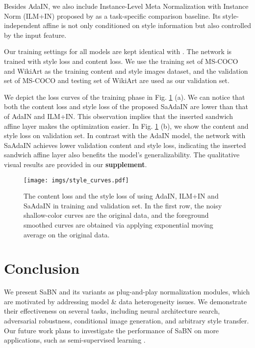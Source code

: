 \documentclass{article}
\begin{document}
Besides AdaIN, we also include Instance-Level Meta Normalization with Instance Norm  (ILM+IN) proposed by \cite{jia2019instance} as a task-specific comparison baseline. Its style-independent affine is not only conditioned on style information but also controlled by the input feature. 

Our training settings for all models are kept identical with \citep{huang2017arbitrary}.  The network is trained with style loss and content loss. We use the training set of MS-COCO \cite{lin2014microsoft} and WikiArt \cite{wikiart} as the training content and style images dataset, and the validation set of MS-COCO and testing set of WikiArt are used as our validation set.

We depict the loss curves of the training phase in Fig. \ref{fig:style_curve} (a). We can notice that both the content loss and style loss of the proposed SaAdaIN are lower than that of AdaIN and ILM+IN. This observation implies that the inserted sandwich affine layer makes the optimization easier. In Fig. \ref{fig:style_curve} (b), we show the content and style loss on validation set. In contrast with the AdaIN model, the network with SaAdaIN achieves lower validation content and style loss, indicating the inserted sandwich affine layer also benefits the model's generalizability. The qualitative visual results are provided in our \textbf{supplement}.
\begin{figure}[t!]
\begin{center}
\texttt{[image: imgs/style\_curves.pdf]}
\end{center}
   \caption{The content loss and the style loss of using AdaIN, ILM+IN and SaAdaIN in training and validation set. In the first row, the noisy shallow-color curves are the original data, and the foreground smoothed curves are obtained via applying exponential moving average on the original data.}
\label{fig:style_curve}
\end{figure}  \section{Conclusion}
 \vspace{-5pt}
We present SaBN and its variants as plug-and-play normalization modules, which are motivated by addressing model \& data heterogeneity issues. We demonstrate their effectiveness on several tasks, including neural architecture search, adversarial robustness, conditional image generation, and arbitrary style transfer. Our future work plans to investigate the performance of SaBN on more applications, such as semi-supervised learning \citep{zajkac2019split}. 
\nocite{langley00}



\end{document}

